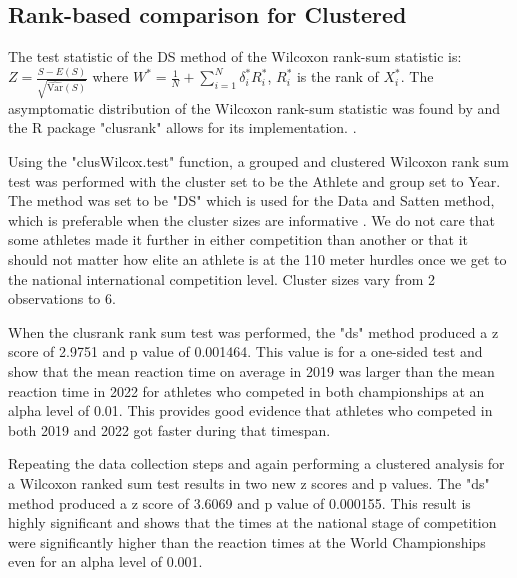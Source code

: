 \documentclass[12pt, letterpaper, titlepage]{article}
\begin{document}



\subsection{Rank-based comparison for Clustered}




The test statistic of the DS method of the Wilcoxon rank-sum statistic is:
$Z = \frac{S - E(S)}{\sqrt{\hat{\text{Var}}(S)}}$ where 
$W^* = \frac{1}{N} + \sum_{i=1}^{N} \delta_{i}^{*} R_{i}^{*}$, $R_{i}^{*}$ is
the rank of $X_{i}^{*}$.
The asymptomatic distribution of the Wilcoxon rank-sum statistic was found by
\citet{datta2005rank} and the R package "clusrank" allows for its implementation.
\citep{jiang2017wilcoxon}.


Using the "clusWilcox.test" function, a grouped and clustered Wilcoxon rank sum
test was performed with the cluster set to be the Athlete and group set to Year.
The method was set to be "DS" which is used for the Data and Satten method, which
is preferable when the cluster sizes are informative \citep{jiang2017wilcoxon}.  We do not care that some
athletes made it further in either competition than another or that it should
not matter how elite an athlete is at the 110 meter hurdles once we get to the
national international competition level.  Cluster sizes vary from 2 observations
to 6.

When the clusrank rank sum test was performed, the "ds" method produced a z score of
2.9751 and p value of 0.001464.  This value is for a one-sided test and show that
the mean reaction time on average in 2019 was larger than the mean reaction time
in 2022 for athletes who competed in both championships at an alpha level of 0.01.
This provides good evidence that athletes who competed in both 2019 and 2022 got
faster during that timespan.


Repeating the data collection steps and
again performing a clustered analysis for a Wilcoxon ranked sum test
results in two new z scores and p values.  The "ds" method produced a z score of
3.6069 and p value of 0.000155.  This result is highly significant and shows that
the times at the national stage of competition were significantly higher than
the reaction times at the World Championships even for an alpha level of 0.001.
\end{document}
